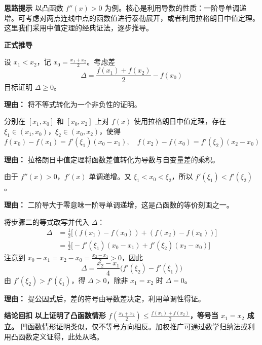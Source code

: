 \begin{proofbox}
\textbf{\textcolor{CProof}{思路提示}}
以凸函数 $f''(x)>0$ 为例。核心是利用导数的性质：一阶导单调递增。可考虑对两点连线中点的函数值进行泰勒展开，或者利用拉格朗日中值定理。这里我们采用中值定理的经典证法，逐步推导。

\medskip
\textbf{\textcolor{CProof}{正式推导}}
\begin{description}[style=nextline, leftmargin=2.8em, labelsep=0.5em, itemsep=0.55em]
    \item[\textbf{步骤一（构造中点差值）：}] 
    设 $x_1 < x_2$，记 $x_0 = \frac{x_1+x_2}{2}$。考虑差
    \[
    \Delta = \frac{f(x_1)+f(x_2)}{2} - f(x_0)
    \]
    目标证明 $\Delta \ge 0$。
    \par\textbf{理由：} 将不等式转化为一个非负性的证明。

    \item[\textbf{步骤二（应用中值定理）：}] 
    分别在 $[x_1, x_0]$ 和 $[x_0, x_2]$ 上对 $f(x)$ 使用拉格朗日中值定理，存在 $\xi_1 \in (x_1, x_0)$，$\xi_2 \in (x_0, x_2)$，使得
    \[
    f(x_0)-f(x_1) = f'(\xi_1)(x_0-x_1), \quad f(x_2)-f(x_0) = f'(\xi_2)(x_2-x_0)
    \]
    \par\textbf{理由：} 拉格朗日中值定理将函数差值转化为导数与自变量差的乘积。

    \item[\textbf{步骤三（利用凸性单调性）：}] 
    由于 $f''(x)>0$，$f'(x)$ 单调递增。又 $\xi_1 < x_0 < \xi_2$，所以 $f'(\xi_1) < f'(\xi_2)$。
    \par\textbf{理由：} 二阶导大于零意味一阶导单调递增，这是凸函数的等价刻画之一。

    \item[\textbf{步骤四（重组并判断符号）：}] 
    将步骤二的等式改写并代入 $\Delta$：
    \[
    \begin{aligned}
    \Delta &= \frac{1}{2}\big[(f(x_1)-f(x_0)) + (f(x_2)-f(x_0))\big] \\
           &= \frac{1}{2}\big[-f'(\xi_1)(x_0-x_1) + f'(\xi_2)(x_2-x_0)\big]
    \end{aligned}
    \]
    注意到 $x_0-x_1 = x_2-x_0 = \frac{x_2-x_1}{2} > 0$，因此
    \[
    \Delta = \frac{x_2-x_1}{4} \big( f'(\xi_2) - f'(\xi_1) \big)
    \]
    由 $f'(\xi_2) > f'(\xi_1)$，得 $\Delta > 0$，除非 $x_1=x_2$ 时 $\Delta=0$。
    \par\textbf{理由：} 提公因式后，差的符号由导数差决定，利用单调性得证。
\end{description}

\medskip
\textbf{\textcolor{CProof}{结论回扣}}
\textbf{以上证明了凸函数情形 $f\left(\frac{x_1+x_2}{2}\right) \le \frac{f(x_1)+f(x_2)}{2}$，等号当 $x_1=x_2$ 成立。} 凹函数情形证明类似，仅不等号方向相反。加权推广可通过数学归纳法或利用凸函数定义证得，此处从略。
\end{proofbox}
